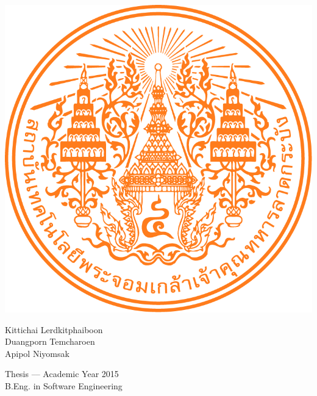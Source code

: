 \thispagestyle{empty}
\begin{center}

    \centering
    \includegraphics[width=0.3\linewidth]{res/kmitl_logo.png}
    \vspace{3cm}
    
    \Large\MakeUppercase{\dms}
    \vspace{3cm}
    
    {\Large 
    Kittichai Lerdkitphaiboon \\ 
    Duangporn Temcharoen \\
    Apipol Niyomsak
    \par}
    
    \vfill
    
    {\Large Thesis --– Academic Year 2015 \\
    B.Eng. in Software Engineering \\
    \kmitl\par}

\end{center}